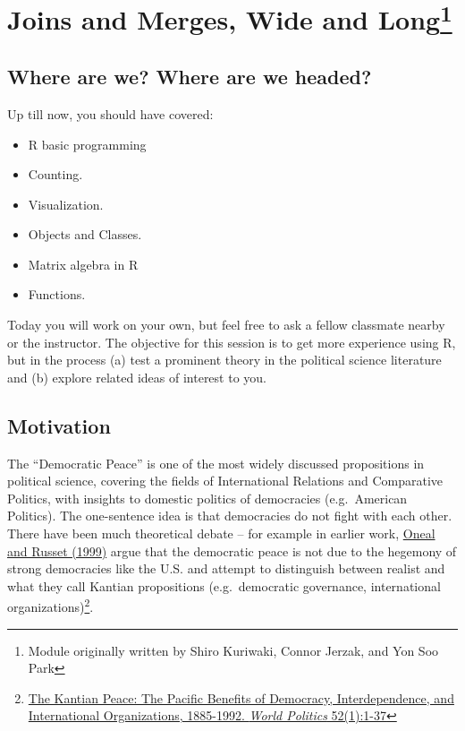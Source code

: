 \documentclass[]{book}
\providecommand{\tightlist}{%
  \setlength{\itemsep}{0pt}\setlength{\parskip}{0pt}}
\let\rmarkdownfootnote\footnote%
\def\footnote{\protect\rmarkdownfootnote}
\theoremstyle{definition}
\theoremstyle{definition}
\theoremstyle{definition}
\theoremstyle{remark}
\begin{document}
\hypertarget{dempeace}{%
\chapter[Joins and Merges, Wide and Long]{\texorpdfstring{Joins and Merges, Wide and Long\footnote{Module originally written by Shiro Kuriwaki, Connor Jerzak, and Yon Soo Park}}{Joins and Merges, Wide and Long}}\label{dempeace}}

\hypertarget{where-are-we-where-are-we-headed-4}{%
\section*{Where are we? Where are we headed?}\label{where-are-we-where-are-we-headed-4}}

Up till now, you should have covered:

\begin{itemize}
\tightlist
\item
  R basic programming
\item
  Counting.
\item
  Visualization.
\item
  Objects and Classes.
\item
  Matrix algebra in R
\item
  Functions.
\end{itemize}

Today you will work on your own, but feel free to ask a fellow classmate nearby or the instructor. The objective for this session is to get more experience using R, but in the process (a) test a prominent theory in the political science literature and (b) explore related ideas of interest to you.

\hypertarget{motivation-1}{%
\section{Motivation}\label{motivation-1}}

The ``Democratic Peace'' is one of the most widely discussed propositions in political science, covering the fields of International Relations and Comparative Politics, with insights to domestic politics of democracies (e.g.~American Politics). The one-sentence idea is that democracies do not fight with each other. There have been much theoretical debate -- for example in earlier work, \href{https://blackboard.angelo.edu/bbcswebdav/institution/LFA/CSS/Course\%20Material/SEC6302/Readings/Lesson_3/Oneal-Russett.pdf}{Oneal and Russet (1999)} argue that the democratic peace is not due to the hegemony of strong democracies like the U.S. and attempt to distinguish between realist and what they call Kantian propositions (e.g.~democratic governance, international organizations)\footnote{\href{https://blackboard.angelo.edu/bbcswebdav/institution/LFA/CSS/Course\%20Material/SEC6302/Readings/Lesson_3/Oneal-Russett.pdf}{The Kantian Peace: The Pacific Benefits of Democracy, Interdependence, and International Organizations, 1885-1992. \emph{World Politics} 52(1):1-37}}.
\end{document}
